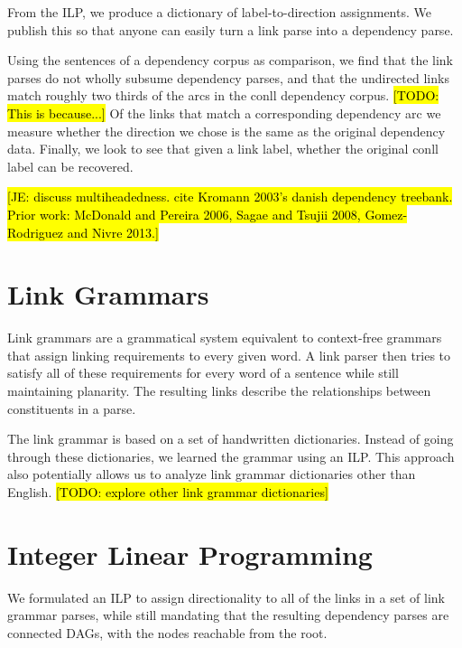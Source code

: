 \documentclass[11pt]{article}
\newcommand{\Note}[1]{}
\renewcommand{\Note}[1]{\hl{[#1]}}  %
\newcommand{\TODO}[1]{\Note{TODO: #1}}
\newcommand{\NoteSigned}[3]{{\sethlcolor{#2}\Note{#1: #3}}}
\newcommand{\NoteJE}[1]{\NoteSigned{JE}{LightBlue}{#1}}
\begin{document}
From the ILP, we produce a dictionary of label-to-direction assignments. We publish this so that anyone can easily turn a link parse into a dependency parse.

Using the sentences of a dependency corpus as comparison, we find that the link parses do not wholly subsume dependency parses, and that the undirected links match roughly two thirds of the arcs in the conll dependency corpus. \TODO{This is because...} 
Of the links that match a corresponding dependency arc we measure whether the direction we chose is the same as the original dependency data. 
Finally, we look to see that given a link label, whether the original conll label can be recovered.








\NoteJE{discuss multiheadedness.  cite Kromann 2003's danish
  dependency treebank.  Prior work: McDonald and Pereira 2006, Sagae
  and Tsujii 2008, Gomez-Rodriguez and Nivre 2013.}


\section{Link Grammars}
Link grammars are a grammatical system equivalent to context-free grammars that assign linking requirements to every given word\cite{SleatorTemperly91}. A link parser then tries to satisfy all of these requirements for every word of a sentence while still maintaining planarity. The resulting links describe the relationships between constituents in a parse. 

The link grammar is based on a set of handwritten dictionaries. Instead of going through these dictionaries, we learned the grammar using an ILP. This approach also potentially allows us to analyze link grammar dictionaries other than English. \TODO{explore other link grammar dictionaries} 


\section{Integer Linear Programming}
We formulated an ILP to assign directionality to all of the links in a set of link grammar parses, while still mandating that the resulting dependency parses are connected DAGs, with the nodes reachable from the root. 
\end{document}
